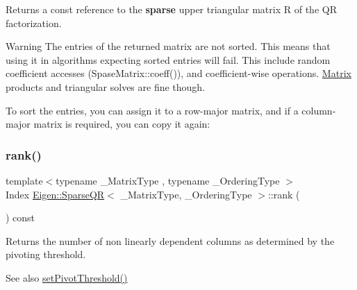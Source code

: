\begin{DoxyReturn}{Returns}
a const reference to the {\bfseries{sparse}} upper triangular matrix R of the QR factorization. 
\end{DoxyReturn}
\begin{DoxyWarning}{Warning}
The entries of the returned matrix are not sorted. This means that using it in algorithms expecting sorted entries will fail. This include random coefficient accesses (Spase\+Matrix\+::coeff()), and coefficient-\/wise operations. \mbox{\hyperlink{class_eigen_1_1_matrix}{Matrix}} products and triangular solves are fine though.
\end{DoxyWarning}
To sort the entries, you can assign it to a row-\/major matrix, and if a column-\/major matrix is required, you can copy it again\+: 
\begin{DoxyCode}{0}
\end{DoxyCode}
 \mbox{\label{class_eigen_1_1_sparse_q_r_a70ec2b9e5cb62a41dc1ee2adfb54e9b0}} 
\subsubsection{\texorpdfstring{rank()}{rank()}}
{\footnotesize\ttfamily template$<$typename \+\_\+\+Matrix\+Type , typename \+\_\+\+Ordering\+Type $>$ \\
Index \mbox{\hyperlink{class_eigen_1_1_sparse_q_r}{Eigen\+::\+Sparse\+QR}}$<$ \+\_\+\+Matrix\+Type, \+\_\+\+Ordering\+Type $>$\+::rank (\begin{DoxyParamCaption}{ }\end{DoxyParamCaption}) const\hspace{0.3cm}{\ttfamily [inline]}}

\begin{DoxyReturn}{Returns}
the number of non linearly dependent columns as determined by the pivoting threshold.
\end{DoxyReturn}
\begin{DoxySeeAlso}{See also}
\mbox{\hyperlink{class_eigen_1_1_sparse_q_r_adb7bfa65f99e3ef91ed58ea663a850a1}{set\+Pivot\+Threshold()}} 
\end{DoxySeeAlso}
\mbox{\label{class_eigen_1_1_sparse_q_r_ab9133b7ace1c19714df99f553666316d}} 
